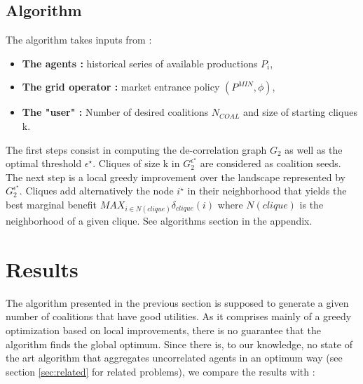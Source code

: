 \documentclass[journal]{IEEEtran}
\begin{document}
\subsection{Algorithm}
The algorithm takes inputs from :

\begin{itemize}
	\item \textbf{The agents :} historical series of available productions $P_{i}$, 
	\item \textbf{The grid operator :} market entrance policy $ (P^{MIN},\phi) $,
	\item \textbf{The "user" :} Number of desired coalitions $ N_{COAL} $ and size of starting cliques k.
\end{itemize} 

The first steps consist in computing the de-correlation graph $ G_{2} $ as well as the optimal threshold $ \epsilon^{\star} $. Cliques of size k in $ G_{2}^{\epsilon^{\star}} $ are considered as coalition seeds. The next step is a local greedy improvement over the landscape represented by  $ G_{2}^{\epsilon^{\star}} $. Cliques add alternatively the node $ i^{\star} $ in their neighborhood that yields the best marginal benefit $ MAX_{ i \in N(clique) } \delta_{clique}(i) $ where $ N(clique) $ is the neighborhood of a given clique. See algorithms section in the appendix.


%
%
\section{Results}
\label{sec:results}

The algorithm presented in the previous section is supposed to generate a given number of coalitions that have good utilities. As it comprises mainly of a greedy optimization based on local improvements, there is no guarantee that the algorithm finds the global optimum. Since there is, to our knowledge, no state of the art algorithm that aggregates uncorrelated agents in an optimum way (see section \ref{sec:related} for related problems), we compare the results with :
\end{document}

